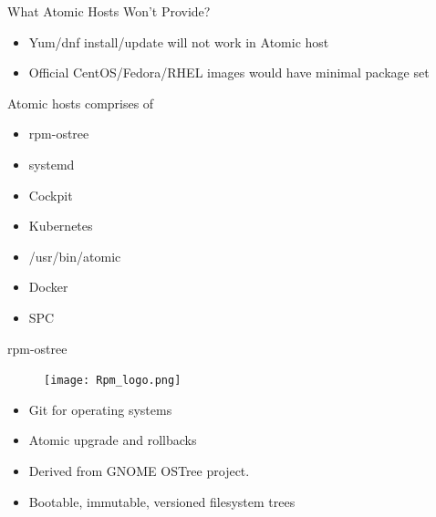\documentclass{beamer}
\begin{document}
\begin{frame}{What Atomic Hosts Won't Provide?}
\begin{itemize}
  \item Yum/dnf install/update will not work in Atomic host
  \item Official CentOS/Fedora/RHEL images would have minimal package set
\end{itemize}
\end{frame}

\begin{frame}{Atomic hosts comprises of}
\begin{itemize}
  \item rpm-ostree
  \item systemd
  \item Cockpit
  \item Kubernetes
  \item /usr/bin/atomic
  \item Docker
  \item SPC
\end{itemize}
\end{frame}

\begin{frame}{rpm-ostree}
\begin{figure}[htp]
\centering
\texttt{[image: Rpm\_logo.png]}
\label{}
\end{figure}
\begin{itemize}
  \item Git for operating systems
  \item Atomic upgrade and rollbacks
  \item Derived from GNOME OSTree project.
  \item Bootable, immutable, versioned filesystem trees
\end{itemize}
\end{frame}
\end{document}
